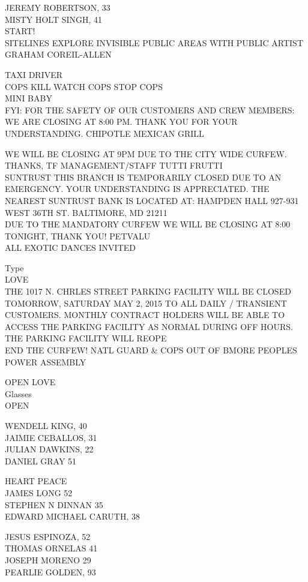 \documentclass[10pt,letterpaper]{article}
\begin{document}
JEREMY ROBERTSON, 33\\
MISTY HOLT SINGH, 41\\
START!\\
SITELINES EXPLORE INVISIBLE PUBLIC AREAS WITH PUBLIC ARTIST GRAHAM COREIL{-}ALLEN

TAXI DRIVER\\
COPS KILL WATCH COPS STOP COPS\\
MINI BABY\\
FYI: FOR THE SAFETY OF OUR CUSTOMERS AND CREW MEMBERS: WE ARE CLOSING AT 8:00 PM.  THANK YOU FOR YOUR UNDERSTANDING.  CHIPOTLE MEXICAN GRILL

WE WILL BE CLOSING AT 9PM DUE TO THE CITY WIDE CURFEW.  THANKS, TF MANAGEMENT/STAFF  TUTTI FRUTTI\\
SUNTRUST THIS BRANCH IS TEMPORARILY CLOSED DUE TO AN EMERGENCY.  YOUR UNDERSTANDING IS APPRECIATED.  THE NEAREST SUNTRUST BANK IS LOCATED AT: HAMPDEN HALL 927{-}931 WEST 36TH ST. BALTIMORE, MD 21211\\
DUE TO THE MANDATORY CURFEW WE WILL BE CLOSING AT 8:00 TONIGHT, THANK YOU!  PETVALU\\
ALL EXOTIC DANCES INVITED

Type\\
LOVE\\
THE 1017 N. CHRLES STREET PARKING FACILITY WILL BE CLOSED TOMORROW, SATURDAY MAY 2, 2015 TO ALL DAILY / TRANSIENT CUSTOMERS.  MONTHLY CONTRACT HOLDERS WILL BE ABLE TO ACCESS THE PARKING FACILITY AS NORMAL DURING OFF HOURS.  THE PARKING FACILITY WILL REOPE\\
END THE CURFEW!  NATL GUARD \& COPS OUT OF BMORE PEOPLES POWER ASSEMBLY

OPEN LOVE\\
Glasses\\
OPEN

WENDELL KING, 40\\
JAIMIE CEBALLOS, 31\\
JULIAN DAWKINS, 22\\
DANIEL GRAY 51

HEART PEACE\\
JAMES LONG 52\\
STEPHEN N DINNAN 35\\
EDWARD MICHAEL CARUTH, 38

JESUS ESPINOZA, 52\\
THOMAS ORNELAS 41\\
JOSEPH MORENO 29\\
PEARLIE GOLDEN, 93
\end{document}
